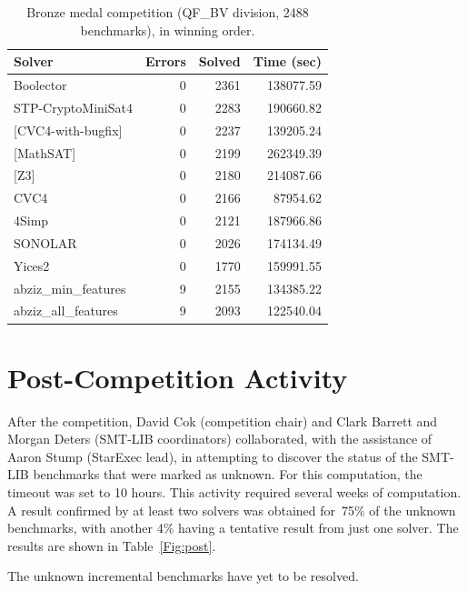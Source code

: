 \documentclass[twoside,11pt]{article}
\begin{document}
\begin{table}
\caption{Bronze medal competition (QF\_BV division, 2488 benchmarks), in winning order.}
\label{Table:bronze}
\centering
\begin{tabular}{|l|rrr|}
\hline
 Solver & Errors & Solved & Time (sec)\\
\hline
Boolector &	0  &		2361  &		138077.59 \\
STP-CryptoMiniSat4 & 0  &		2283  &		190660.82 	\\
{[}CVC4-with-bugfix] &	0  &		2237 	 &		139205.24 \\
{[}MathSAT]  &	0  &		2199 	 &		262349.39 \\
{[}Z3]  & 	0  &		2180 	 &		214087.66 	\\
CVC4  &	0  &		2166 	 &		87954.62 	\\
4Simp &	0 &	2121 	 &		187966.86 \\
SONOLAR &	0  &		2026  &	 	174134.49 \\
Yices2 &	0  &		1770  &	 	159991.55 \\
abziz\_min\_features &	9  &		2155 	 &	 	134385.22 \\
abziz\_all\_features &	9  &		2093 	 &	 	122540.04 \\
\hline
\end{tabular}
\end{table}

\section{Post-Competition Activity}
\label{sec:post}

After the competition, David Cok (competition chair) and Clark Barrett and Morgan Deters (SMT-LIB coordinators) collaborated, with the assistance of Aaron Stump (StarExec lead), in attempting to discover the status of the SMT-LIB benchmarks that were marked as unknown. For this computation, the timeout was set to 10 hours. This activity required several weeks of computation. A result confirmed by at least two solvers was obtained for~75\% of the unknown benchmarks, with another 4\% having a tentative result from just one solver.
The results are shown in Table~\ref{Fig:post}.

The unknown incremental benchmarks have yet to be resolved.
\end{document}
